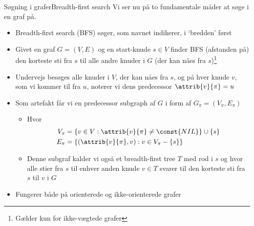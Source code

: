 \documentclass[aspectratio=1610]{beamer}
\begin{document}
\begin{frame}{Søgning i grafer}{Breadth-first search}
    Vi ser nu på to fundamentale måder at søge i en graf på.

    \begin{itemize}[<+(1)->]
        \item \alert{Breadth-first search} (BFS) søger, som navnet indikerer, i
            `bredden' først
        \item Givet en graf $G = (V,E)$ og en start-knude $s \in V$ finder BFS
            (afstanden på) den korteste sti fra $s$ til alle andre knuder i $G$
            (der kan nåes fra $s$)\footnote{%
                Gælder kun for ikke-vægtede grafer
            }
        \item Undervejs besøges \alert{alle} knuder i $V$, der kan nåes fra $s$,
            og på hver knude $v$, som vi kommer til fra $u$, noterer vi dens
            \alert{predecessor} $\attrib{v}{\pi} = u$
        \item Som artefakt får vi en \alert{predecessor subgraph} af $G$ i form
            af $G_{\pi} = (V_{\pi},E_{\pi})$
            \begin{itemize}
                \item Hvor
                    \begin{align*}
                        V_{\pi}&= \{v \in V : \attrib{v}{\pi} \neq \const{NIL}
                        \} \cup \{s\} \\
                            E_{\pi}&= \{(\attrib{v}{\pi},v) : v \in V_{\pi} -
                            \{s\}\}
                    \end{align*}
                \item Denne subgraf kalder vi også et \alert{breadth-first tree}
                    $T$ med rod i $s$ og hvor alle stier fra $s$ til enhver
                    anden knude $v \in T$ svarer til den korteste sti fra $s$
                    til $v$ i $G$
            \end{itemize}
        \item Fungerer både på orienterede og ikke-orienterede grafer
    \end{itemize}
\end{frame}
\end{document}

